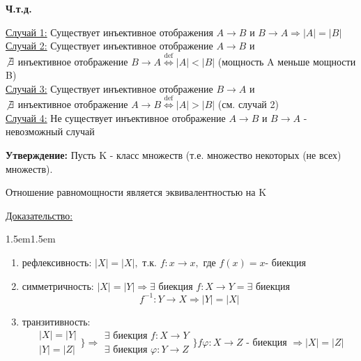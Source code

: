 \documentclass[12pt]{article}
\begin{document}
    \begin{center}
        \textbf{Ч.т.д.}
    \end{center}
    \underline{Случай 1:} Существует инъективное отображения $A \rightarrow B$ и $B \rightarrow A \Rightarrow |A|=|B|$\\
    \underline{Случай 2:} Существует инъективное отображение $A \rightarrow B$ и \\
    $\not \exists$ инъективное отображение $B \rightarrow A \overset{\text{def}}{\Leftrightarrow}|A| < |B|$
    (мощность A меньше мощности B)\\
    \underline{Случай 3:} Существует инъективное отображение $B \rightarrow A $ и \\
    $\not \exists$ инъективное отображение $A \rightarrow B \overset{\text{def}}{\Leftrightarrow} |A|>|B|$
    (см. случай 2)\\
    \underline{Случай 4:} Не существует инъективное отображение $A \rightarrow B$ и $B \rightarrow A$ - невозможный
    случай\\
    \par
    \textbf{Утверждение:}
    Пусть K - класс множеств (т.е. множество некоторых (не всех) множеств). 
    \begin{center}
        Отношение равномощности является эквивалентностью на K
    \end{center}
    \underline{Доказательство:}
    \begin{adjustwidth}{1.5em}{1.5em}
        \begin{enumerate}
            \item рефлексивность: $|X|=|X|,$ т.к. $f: x\rightarrow x,$ где $f(x)=x$- биекция
            \item симметричность: $|X|=|Y| \Rightarrow \exists$ биекция $f:X \rightarrow Y = \exists$ биекция
            \[f^{-1}: Y \rightarrow X \Rightarrow |Y|=|X|\]
            \item транзитивность: \\
            \[\begin{matrix}
                |X|=|Y|\\
                |Y|=|Z|
            \end{matrix} \Big\} \Rightarrow
            \begin{matrix}
                \exists \text{ биекция } f: X \rightarrow Y\\
                \exists \text{ биекция } \varphi: Y \rightarrow Z 
            \end{matrix} \Big\} f\varphi: X\rightarrow Z \text{ - биекция }\Rightarrow |X|=|Z|\]
        \end{enumerate}
    \end{adjustwidth}
\end{document}
